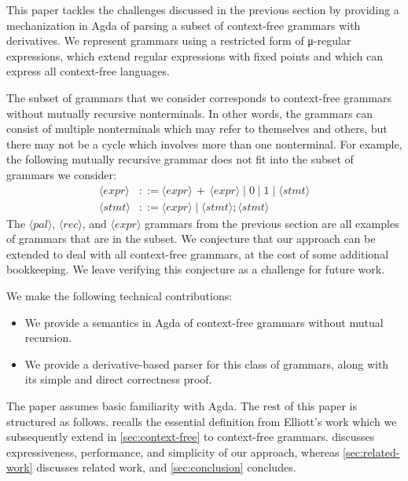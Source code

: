 This paper tackles the challenges discussed in the previous section by providing a mechanization in Agda of parsing a subset of context-free grammars with derivatives.
We represent grammars using a restricted form of μ-regular expressions, which extend regular expressions with fixed points and which can express all context-free languages.

The subset of grammars that we consider corresponds to context-free grammars without mutually recursive nonterminals.
In other words, the grammars can consist of multiple nonterminals which may refer to themselves and others, but there may not be a cycle which involves more than one nonterminal.
For example, the following mutually recursive grammar does not fit into the subset of grammars we consider:
\begin{align*}
\langle\mathit{expr}\rangle &::= \langle\mathit{expr}\rangle\, +\, \langle\mathit{expr}\rangle \mid 0 \mid 1 \mid \langle\mathit{stmt}\rangle
\\
\langle\mathit{stmt}\rangle &::= \langle\mathit{expr}\rangle \mid \langle\mathit{stmt}\rangle ; \langle\mathit{stmt}\rangle
\end{align*}
The $\langle\mathit{pal}\rangle$, $\langle\mathit{rec}\rangle$, and $\langle\mathit{expr}\rangle$ grammars from the previous section are all examples of grammars that are in the subset.
We conjecture that our approach can be extended to deal with all context-free grammars, at the cost of some additional bookkeeping.
We leave verifying this conjecture as a challenge for future work.

We make the following technical contributions:
\begin{itemize}
\item We provide a semantics in Agda of context-free grammars without mutual recursion.
\item We provide a derivative-based parser for this class of grammars, along with its simple and direct correctness proof.
\end{itemize}

The paper assumes basic familiarity with Agda.
The rest of this paper is structured as follows.
 recalls the essential definition from Elliott's work which we subsequently extend in \cref{sec:context-free} to context-free grammars.
 discusses expressiveness, performance, and simplicity of our approach, whereas
\cref{sec:related-work} discusses related work, and \cref{sec:conclusion} concludes.




